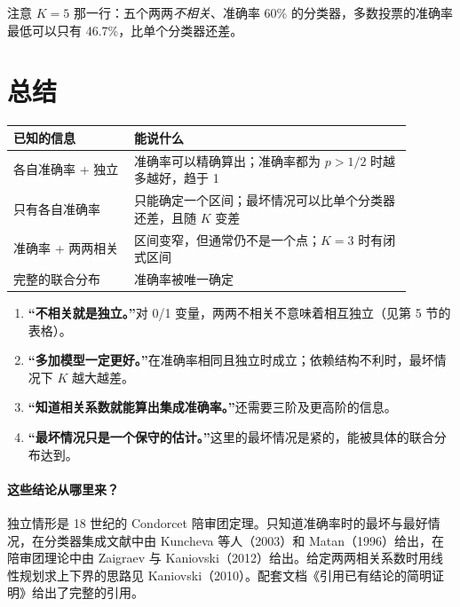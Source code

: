 \documentclass[11pt]{article}
\begin{document}
注意 $K=5$ 那一行：五个两两\emph{不相关}、准确率 60\% 的分类器，多数投票的准确率最低可以只有 46.7\%，比单个分类器还差。

\section{总结}

\begin{center}
\small
\renewcommand{\arraystretch}{1.3}
\begin{tabular}{>{\raggedright\arraybackslash}p{0.27\linewidth}>{\raggedright\arraybackslash}p{0.62\linewidth}}
\toprule
已知的信息 & 能说什么\\
\midrule
各自准确率 + 独立 & 准确率可以精确算出；准确率都为 $p>1/2$ 时越多越好，趋于 1\\
只有各自准确率 & 只能确定一个区间；最坏情况可以比单个分类器还差，且随 $K$ 变差\\
准确率 + 两两相关 & 区间变窄，但通常仍不是一个点；$K=3$ 时有闭式区间\\
完整的联合分布 & 准确率被唯一确定\\
\bottomrule
\end{tabular}
\end{center}

\begin{warnbox}[title=四个常见误区]
\begin{enumerate}[leftmargin=1.6em]
\item \textbf{“不相关就是独立。”}对 0/1 变量，两两不相关不意味着相互独立（见第 5 节的表格）。
\item \textbf{“多加模型一定更好。”}在准确率相同且独立时成立；依赖结构不利时，最坏情况下 $K$ 越大越差。
\item \textbf{“知道相关系数就能算出集成准确率。”}还需要三阶及更高阶的信息。
\item \textbf{“最坏情况只是一个保守的估计。”}这里的最坏情况是紧的，能被具体的联合分布达到。
\end{enumerate}
\end{warnbox}

\paragraph{这些结论从哪里来？}独立情形是 18 世纪的 Condorcet 陪审团定理。只知道准确率时的最坏与最好情况，在分类器集成文献中由 Kuncheva 等人（2003）和 Matan（1996）给出，在陪审团理论中由 Zaigraev 与 Kaniovski（2012）给出。给定两两相关系数时用线性规划求上下界的思路见 Kaniovski（2010）。配套文档《引用已有结论的简明证明》给出了完整的引用。
\end{document}
